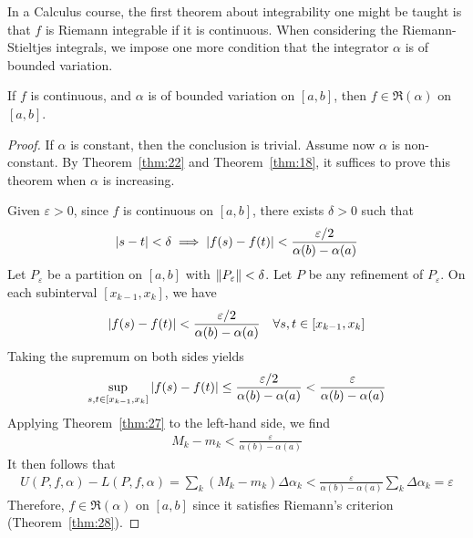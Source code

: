 \documentclass[thmcnt=section, 12pt]{my-elegantbook}
\begin{document}
In a Calculus course,
the first theorem about integrability one might be taught is
that $ f $ is Riemann integrable if it is continuous.
When considering the Riemann-Stieltjes integrals,
we impose one more condition that the integrator
$ \alpha $ is of bounded variation.

\begin{theorem} \label{thm:75}
    If $f$ is continuous,
    and $\alpha$ is of bounded variation on $[a, b]$,
    then $f \in \mathfrak{R}(\alpha)$ on $[a, b]$.
\end{theorem}

\begin{proof}
    If $\alpha$ is constant, then the conclusion is trivial.
    Assume now $ \alpha $ is non-constant.
    By Theorem~\ref{thm:22} and Theorem~\ref{thm:18},
    it suffices to prove this theorem when $ \alpha $ is increasing.

    Given $ \varepsilon > 0 $,
    since $ f $ is continuous on $ [a, b] $,
    there exists $ \delta > 0 $ such that
    \begin{align*}
        \left\lvert s - t \right\rvert < \delta
        \implies \left\lvert f(s) - f(t) \right\rvert < \frac{ \varepsilon / 2 }{
            \alpha(b) - \alpha(a)
        }
    \end{align*}
    Let $ P_{ \varepsilon } $ be a partition on $ [a, b] $ with
    $ \left\lVert P_\varepsilon \right\rVert < \delta $.
    Let $ P $ be any refinement of $ P_\varepsilon $.
    On each subinterval $ [x_{k-1}, x_k] $, we have
    \begin{align*}
        \left\lvert f(s) - f(t) \right\rvert < \frac{ \varepsilon / 2 }{
            \alpha(b) - \alpha(a)
        }
        \quad \forall s, t \in [x_{k-1}, x_k]
    \end{align*}
    Taking the supremum on both sides yields
    \begin{align*}
        \sup_{s,t \in [x_{k-1}, x_k]} \left\lvert f(s) - f(t) \right\rvert
        \leq \frac{ \varepsilon / 2 }{
            \alpha(b) - \alpha(a)
        } < \frac{ \varepsilon }{
            \alpha(b) - \alpha(a)
        }
    \end{align*}
    Applying Theorem~\ref{thm:27} to the left-hand side, we find
    \begin{align*}
        M_k - m_k < \frac{ \varepsilon }{
            \alpha(b) - \alpha(a)
        }
    \end{align*}
    It then follows that
    \begin{align*}
        U(P,f, \alpha) - L(P,f, \alpha)
        = \sum_{k} (M_k - m_k) \Delta \alpha_k
        < \frac{ \varepsilon }{ \alpha(b) - \alpha(a) }
        \sum_{k} \Delta \alpha_k
        = \varepsilon
    \end{align*}
    Therefore, $ f \in \mathfrak{R}(\alpha) $ on $ [a, b] $
    since it satisfies Riemann's criterion (Theorem~\ref{thm:28}).
\end{proof}
\end{document}
